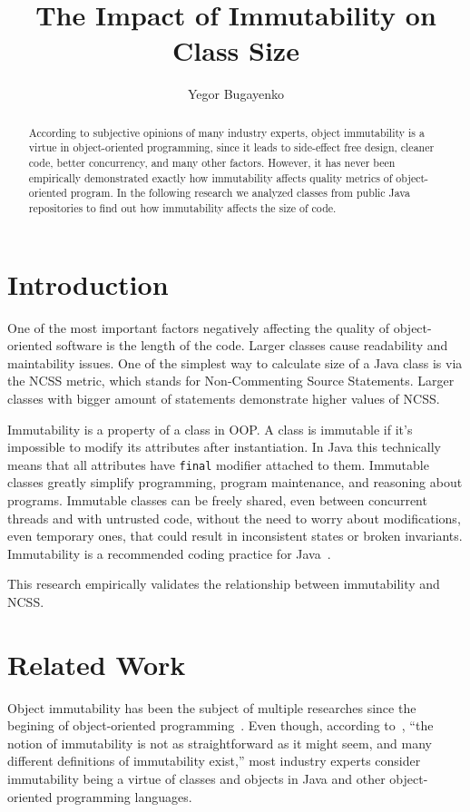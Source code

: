 \documentclass[12pt]{article}
\title{The Impact of Immutability on Class Size}
\author{Yegor Bugayenko}{}{}
\begin{document}
\raggedbottom
\maketitle

\begin{abstract}
According to subjective opinions of many industry experts,
object immutability is a virtue in object-oriented programming, since it
leads to side-effect free design, cleaner code, better concurrency,
and many other factors. However, it has never been empirically
demonstrated exactly how immutability affects quality metrics of
object-oriented program. In the following research we analyzed
\thetotaljavafiles{} classes from \thetotalrepos{} public Java repositories
to find out how immutability affects the size of code.
\end{abstract}

\section{Introduction}

One of the most important factors negatively affecting the quality
of object-oriented software is the length of the code. Larger classes
cause readability and maintability issues. One of the simplest way
to calculate size of a Java class is via the NCSS metric, which
stands for Non-Commenting Source Statements. Larger classes with bigger
amount of statements demonstrate higher values of NCSS.

Immutability is a property of a class in OOP. A class is immutable if
it's impossible to modify its attributes after instantiation. In Java this
technically means that all attributes have \texttt{final} modifier attached
to them.
Immutable classes greatly simplify programming, program maintenance, and
reasoning about programs. Immutable classes can be freely shared, even between
concurrent threads and with untrusted code, without the need to worry
about modifications, even temporary ones, that could result in
inconsistent states or broken invariants.
Immutability is a recommended coding practice for Java~\citep{bloch2016}.

This research empirically validates the relationship between immutability
and NCSS.

\section{Related Work}

Object immutability has been the subject of multiple researches since
the begining of object-oriented programming~\citep{hakonen1999,porat2000,lea2000,taivalsaari1993}.
Even though, according to~\citet{potanin2013},
``the notion of immutability is not as straightforward as it might seem, and many
different definitions of immutability exist,'' most industry experts consider
immutability being a virtue of classes and objects in Java and other
object-oriented programming languages.
\end{document}
